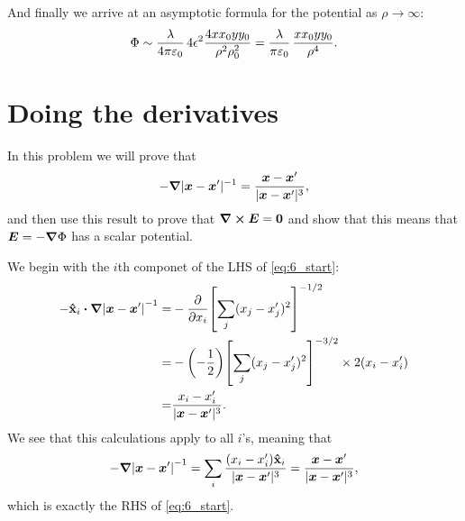 \documentclass[11pt,letter, swedish, english
]{article}
\newcommand{\enaught}{\ensuremath\varepsilon_0}
\begin{document}
And finally we arrive at an asymptotic formula for the potential as
$\rho\to\infty$:
\begin{equation}
\Phi\sim \frac{\lambda}{4\pi\enaught}\,
4\epsilon^2\frac{4xx_0yy_0}{\rho^2\rho_0^2}
=\frac{\lambda}{\pi\enaught}\,\frac{xx_0yy_0}{\rho^4}.
\end{equation}




\section{Doing the derivatives}
In this problem we will prove that
\begin{equation}\label{eq:6_start}
-\grad|\vb*x-\vb*x'|^{-1}
=\frac{\vb*x-\vb*x'}{|\vb*x-\vb*x'|^{3}},
\end{equation}
and then use this result to prove that $\curl\vb*E=\vb0$ and show that
this means that $\vb*E=-\grad\Phi$ has a scalar potential.

We begin with the $i$th componet of the LHS of \eqref{eq:6_start}:
\begin{equation}
\begin{aligned}
-\vu{x}_i\vdot\grad\qty|\vb*x-\vb*x'|^{-1}
=&-\pdv{x_i}\qty[\sum_j(x_j-x_j')^2]^{-1/2}\\
=&-\qty(-\frac{1}{2})\qty[\sum_j(x_j-x_j')^2]^{-3/2}
\times 2(x_i-x_i')\\
=&\frac{x_i-x_i'}{|\vb*x-\vb*x'|^3}.
\end{aligned}
\end{equation}
We see that this calculations apply to all $i$'s, meaning that
\begin{equation}
-\grad\qty|\vb*x-\vb*x'|^{-1}=
\sum_i\frac{(x_i-x_i')\vu{x}_i}{|\vb*x-\vb*x'|^3}
=\frac{\vb*x-\vb*x'}{|\vb*x-\vb*x'|^{3}},
\end{equation}
which is exactly the RHS of \eqref{eq:6_start}.
\end{document}
